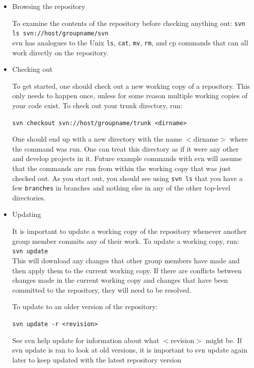 \begin{itemize}
\item Browsing the repository

To examine the contents of the repository before checking anything out: \texttt{svn ls svn://host/groupname/svn}\\

svn has analogues to the Unix \texttt{ls}, \texttt{cat}, \texttt{mv}, \texttt{rm}, and cp commands that can all work directly on the repository. 

\item Checking out

To get started, one should check out a new working copy of a repository. This only needs to happen once, unless for some reason multiple working copies of your code exist. To check out your trunk directory, run:

\texttt{svn checkout svn://host/groupname/trunk <dirname>}

One should end up with a new directory with the name $<$dirname$>$ where the command was run. One can treat this directory as if it were any other and develop projects in it. Future example commands with svn will assume that the commands are run from within the working copy that was just checked out. As you start out, you should see using \texttt{svn ls} that you have a few \texttt{branches} in branches and nothing else in any of the other top-level directories. 

\item Updating

It is important to update a working copy of the repository whenever another group member commits any of their work. To update a working copy, run:\\

\texttt{svn update}\\

This will download any changes that other group members have made and then apply them to the current working copy. If there are conflicts between changes made in the current working copy and changes that have been committed to the repository, they will need to be resolved.

To update to an older version of the repository:

\texttt{svn update -r <revision>}

See svn help update for information about what $<$revision$>$ might be. If svn update is ran to look at old versions, it is important to svn update again later to keep updated with the latest repository version


\end{itemize}
